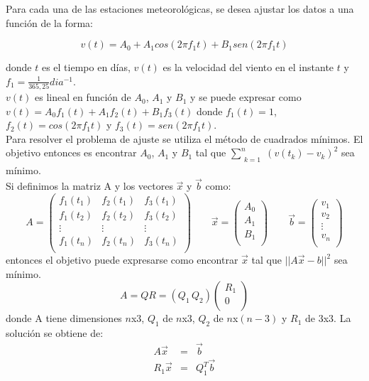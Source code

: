\documentclass[journal, monochrome]{IEEEtran}
\begin{document}
\par
Para cada una de las estaciones meteorológicas, se desea ajustar los datos a una función de la forma:

\begin{equation}
v(t) = A_{0} + A_{1}cos(2\pi f_{1}t) + B_{1}sen(2\pi f_{1}t)
\label{equation:model}
\end{equation}

donde $t$ es el tiempo en días, $v(t)$ es la velocidad del viento en el instante $t$ y $f_{1} = \frac{1}{365,25} dia^{-1}$. \\
$v(t)$ es lineal en función de $A_{0}$, $A_{1}$ y $B_{1}$ y se puede expresar como $v(t) = A_{0}f_{1}(t) + A_{1}f_{2}(t) + B_{1}f_{3}(t)$ donde $f_{1}(t) = 1$, $f_{2}(t) = cos(2\pi f_{1}t)$ y $f_{3}(t) = sen(2\pi f_{1}t)$. \\
Para resolver el problema de ajuste se utiliza el método de cuadrados mínimos. El objetivo entonces es encontrar $A_{0}$, $A_{1}$ y $B_{1}$ tal que 
$\displaystyle\sum_{\substack{k=1}}^{n} (v(t_{k})- v_{k})^{2} $ sea mínimo. \\
Si definimos la matriz A y los vectores $\vec{x}$ y $\vec{b}$ como:
\begin{equation}
A = \left(\begin{array}{ccc}
f_{1}(t_{1}) & f_{2}(t_{1}) & f_{3}(t_{1}) \\
f_{1}(t_{2}) & f_{2}(t_{2}) & f_{3}(t_{2}) \\
\vdots & \vdots & \vdots \\
f_{1}(t_{n}) & f_{2}(t_{n}) & f_{3}(t_{n}) \\
\end{array} \right) \qquad
\vec{x} = \left(\begin{array}{c}
A_{0} \\
A_{1} \\
B_{1} \\
\end{array} \right) \qquad
\vec{b} = \left(\begin{array}{c}
v_{1} \\
v_{2} \\
\vdots \\
v_{n} \\
\end{array} \right)
\end{equation}
entonces el objetivo puede expresarse como encontrar $\vec{x}$ tal que $||A\vec{x} - {b}||^{2}$ sea mínimo. \\
\begin{equation}
A = QR = (Q_{1} \, Q_{2}) \left( \begin{array}{c}
R_{1} \\
0 \\
\end{array} \right)
\end{equation}
donde A tiene dimensiones $n$x$3$, $Q_{1}$ de $n$x$3$, $Q_{2}$ de $n$x$(n-3)$ y $R_{1}$ de $3$x$3$.
La solución se obtiene de:
\begin{eqnarray}
A\vec{x} & = & \vec{b} \\
R_{1}\vec{x} & = & Q_{1}^{T}\vec{b} 
\end{eqnarray}
\end{document}

